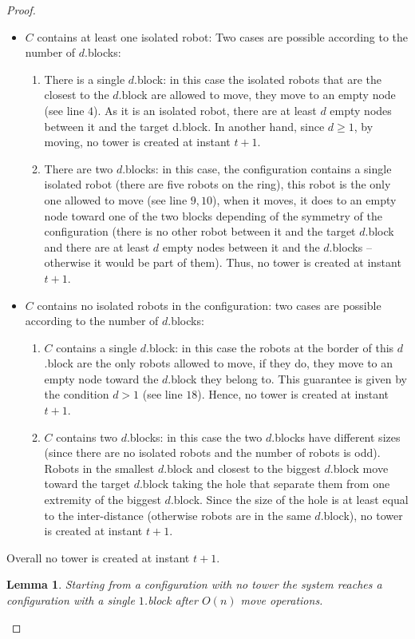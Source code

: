 \documentclass[12pt]{llncs}
\newtheorem{lem}{Lemma}
\begin{document}
\begin{proof}
\begin{itemize}
\item{$C$ contains at least one isolated robot:} Two cases are possible according to the number of $d$.blocks:
\begin{enumerate}
\item{There is a single $d$.block:} in this case the isolated robots that are the closest to the $d$.block are allowed to move, they move to an empty node (see line $4$). As it is an isolated robot, there are at least $d$ empty nodes between it and the target d.block. In another hand, since $d \geq 1$, by moving, no tower is created at instant $t+1$.
\item{There are two $d$.blocks:} in this case, the configuration contains a single isolated robot (there are five robots on the ring), this robot is the only one allowed to move (see line $9,10$), when it moves, it does to an empty node toward one of the two blocks depending of the symmetry of the configuration (there is no other robot between it and the target $d$.block and there are at least $d$ empty nodes between it and the $d$.blocks -- otherwise it would be part of them). Thus, no tower is created at instant $t+1$.
\end{enumerate}
\item{$C$ contains no isolated robots in the configuration:} two cases are possible according to the number of $d$.blocks:
\begin{enumerate}
\item{$C$ contains a single $d$.block:} in this case the robots at the border of this $d$.block are the only robots allowed to move, if they do, they move to an empty node toward the $d$.block they belong to. This guarantee is given by the condition $d>1$ (see line $18$).
Hence, no tower is created at instant $t+1$.
\item{$C$ contains two $d$.blocks:} in this case the two $d$.blocks have different sizes (since there are no isolated robots and the number of robots is odd). Robots in the smallest $d$.block and closest to the biggest $d$.block move toward the target $d$.block taking the hole that separate them from one extremity of the biggest $d$.block. Since the size of the hole is at least equal to the inter-distance (otherwise robots are in the same $d$.block), no tower is created at instant $t+1$.
\end{enumerate}
\end{itemize}
Overall no tower is created at instant $t+1$.

\begin{lem}
\label{lem:ph2}
Starting from a configuration with no tower the system reaches a configuration with a single $1$.block after $O(n)$ move operations.
\end{lem}


\end{proof}
\end{document}
